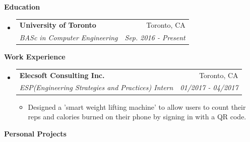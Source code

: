 \documentclass[letterpaper,11pt]{article}
\makeatletter
\newcommand{\resitem}[1]{\item #1 \vspace{-2pt}}
\newcommand{\resheading}[1]{{\large \colorbox{mygrey}{\begin{minipage}{\textwidth}{\textbf{#1 \vphantom{p\^{E}}}}\end{minipage}}}}
\newcommand{\ressubheading}[4]{
\begin{tabular*}{7.0in}{l@{\extracolsep{\fill}}r}
		\textbf{#1} & #2 \\
		\textit{#3} & \textit{#4} \\
\end{tabular*}\vspace{-6pt}}
\makeatother
\begin{document}
\vspace{0.1in}

\resheading{Education}
\begin{itemize}
\item
	\ressubheading{University of Toronto}{Toronto, CA}{BASc in Computer Engineering}{Sep. 2016 - Present}

\end{itemize}


\resheading{Work Experience}
\begin{itemize}
\item
	\ressubheading{Elecsoft Consulting Inc.}{Toronto, CA}{ESP(Engineering Strategies and Practices) Intern}{01/2017 - 04/2017}
	\begin{itemize}
		\resitem{Designed a 'smart weight lifting machine' to allow users to count their reps and calories burned on their phone by signing in with a QR code.}
	\end{itemize}

\end{itemize}


\resheading{Personal Projects}
\end{document}
